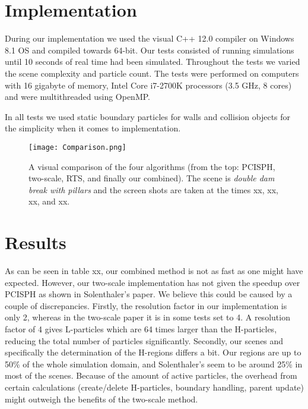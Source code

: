 \documentclass[../../main.tex]{subfiles}
\begin{document}


\section{Implementation}

During our implementation we used the visual C++ 12.0 compiler on Windows 8.1 OS and compiled towards 64-bit. Our tests consisted of running simulations until 10 seconds of real time had been simulated. Throughout the tests we varied the scene complexity and particle count. The tests were performed on computers with 16 gigabyte of memory, Intel Core i7-2700K processors (3.5 GHz, 8 cores) and were multithreaded using OpenMP. 

In all tests we used static boundary particles for walls and collision objects for the simplicity when it comes to implementation. 

\begin{figure}[h!]
    \centering
    \texttt{[image: Comparison.png]}
    \caption{A visual comparison of the four algorithms (from the top: PCISPH, two-scale, RTS, and finally our combined). The scene is \textit{double dam break with pillars} and the screen shots are taken at the times xx, xx, xx, and xx. }
    \label{fig:comparison}
\end{figure}

\section{Results}

As can be seen in table xx, our combined method is not as fast as one might have expected. However, our two-scale implementation has not given the speedup over PCISPH as shown in Solenthaler's paper. We believe this could be caused by a couple of discrepancies. Firstly, the resolution factor in our implementation is only 2, whereas in the two-scale paper it is in some tests set to 4. A resolution factor of 4 gives L-particles which are 64 times larger than the H-particles, reducing the total number of particles significantly. Secondly, our scenes and specifically the determination of the H-regions differs a bit. Our regions are up to 50\% of the whole simulation domain, and Solenthaler's seem to be around 25\% in most of the scenes. Because of the amount of active particles, the overhead from certain calculations (create/delete H-particles, boundary handling, parent update) might outweigh the benefits of the two-scale method. 
\end{document}
